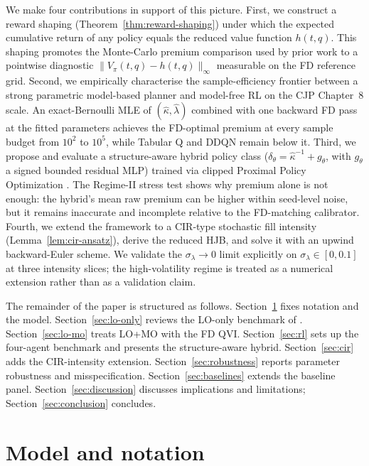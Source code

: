 \documentclass[]{interact}
\theoremstyle{plain}
\theoremstyle{definition}
\theoremstyle{remark}
\newcommand{\1}[1]{\mathbf{1}_{\{#1\}}}
\begin{document}
We make four contributions in support of this picture. First, we construct a reward shaping (Theorem~\ref{thm:reward-shaping}) under which the expected cumulative return of any policy equals the reduced value function $h(t, q)$. This shaping promotes the Monte-Carlo premium comparison used by prior work to a pointwise diagnostic $\|V_\pi(t,q) - h(t,q)\|_\infty$ measurable on the FD reference grid. Second, we empirically characterise the sample-efficiency frontier between a strong parametric model-based planner and model-free RL on the CJP Chapter~8 scale. An exact-Bernoulli MLE of $(\hat\kappa, \hat\lambda)$ combined with one backward FD pass at the fitted parameters achieves the FD-optimal premium at every sample budget from $10^2$ to $10^5$, while Tabular Q and DDQN remain below it. Third, we propose and evaluate a structure-aware hybrid policy class ($\delta_\theta = \hat\kappa^{-1} + g_\theta$, with $g_\theta$ a signed bounded residual MLP) trained via clipped Proximal Policy Optimization \citep{schulman2017ppo}. The Regime-II stress test shows why premium alone is not enough: the hybrid's mean raw premium can be higher within seed-level noise, but it remains inaccurate and incomplete relative to the FD-matching calibrator. Fourth, we extend the framework to a CIR-type stochastic fill intensity (Lemma~\ref{lem:cir-ansatz}), derive the reduced HJB, and solve it with an upwind backward-Euler scheme. We validate the $\sigma_\lambda \to 0$ limit explicitly on $\sigma_\lambda \in [0,0.1]$ at three intensity slices; the high-volatility regime is treated as a numerical extension rather than as a validation claim.

The remainder of the paper is structured as follows. Section~\ref{sec:model} fixes notation and the model. Section~\ref{sec:lo-only} reviews the LO-only benchmark of \citet{carteajaimungal2015}. Section~\ref{sec:lo-mo} treats LO+MO with the FD QVI. Section~\ref{sec:rl} sets up the four-agent benchmark and presents the structure-aware hybrid. Section~\ref{sec:cir} adds the CIR-intensity extension. Section~\ref{sec:robustness} reports parameter robustness and misspecification. Section~\ref{sec:baselines} extends the baseline panel. Section~\ref{sec:discussion} discusses implications and limitations; Section~\ref{sec:conclusion} concludes.

\section{Model and notation}\label{sec:model}
\end{document}
